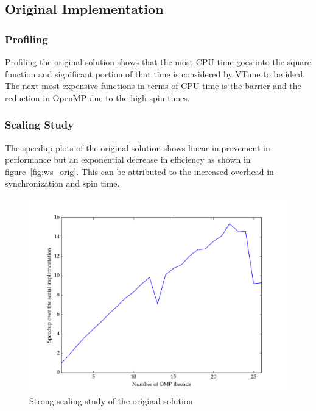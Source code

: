 \documentclass[11pt]{article}
\begin{document}
\subsection{Original Implementation}
\subsubsection{Profiling} \label{sec:prof_orig}

Profiling the original solution shows that the most CPU time goes into the square function and significant portion of that time is considered by VTune to be ideal. The next most expensive functions in terms of CPU time is the barrier and the reduction in OpenMP due to the high spin times. 



\subsubsection{Scaling Study} \label{sec:speedup_orig}

The speedup plots of the original solution shows linear improvement in performance but an exponential decrease in efficiency as shown in figure~\ref{fig:ws_orig}. This can be attributed to the increased overhead in synchronization and spin time.

\begin{figure}[H]
\centering
\includegraphics[scale=0.5]{./scaling_studies/strong_scaling_original.png}
\caption{Strong scaling study of the original solution}
\label{fig:ss_orig}
\end{figure}
\end{document}
